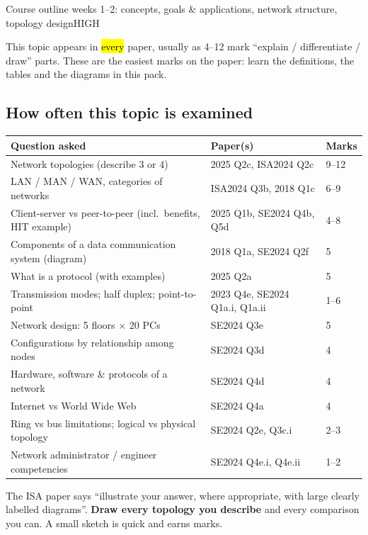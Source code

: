\documentclass[10pt]{article}
\begin{document}
  {Course outline weeks 1--2: concepts, goals \& applications, network structure, topology design}{HIGH}

This topic appears in \hl{every} paper, usually as 4--12 mark ``explain / differentiate / draw'' parts.
These are the easiest marks on the paper: learn the definitions, the tables and the diagrams in this pack.

\subsection*{How often this topic is examined}
\begin{tabularx}{\linewidth}{@{}Xll@{}}
\toprule
\textbf{Question asked} & \textbf{Paper(s)} & \textbf{Marks}\\
\midrule
Network topologies (describe 3 or 4) & 2025 Q2c, ISA2024 Q2c & 9--12\\
LAN / MAN / WAN, categories of networks & ISA2024 Q3b, 2018 Q1c & 6--9\\
Client-server vs peer-to-peer (incl.\ benefits, HIT example) & 2025 Q1b, SE2024 Q4b, Q5d & 4--8\\
Components of a data communication system (diagram) & 2018 Q1a, SE2024 Q2f & 5\\
What is a protocol (with examples) & 2025 Q2a & 5\\
Transmission modes; half duplex; point-to-point & 2023 Q4e, SE2024 Q1a.i, Q1a.ii & 1--6\\
Network design: 5 floors $\times$ 20 PCs & SE2024 Q3e & 5\\
Configurations by relationship among nodes & SE2024 Q3d & 4\\
Hardware, software \& protocols of a network & SE2024 Q4d & 4\\
Internet vs World Wide Web & SE2024 Q4a & 4\\
Ring vs bus limitations; logical vs physical topology & SE2024 Q2e, Q3c.i & 2--3\\
Network administrator / engineer competencies & SE2024 Q4e.i, Q4e.ii & 1--2\\
\bottomrule
\end{tabularx}

\begin{examtip}
The ISA paper says ``illustrate your answer, where appropriate, with large clearly labelled diagrams''.
\textbf{Draw every topology you describe} and every comparison you can. A small sketch is quick and earns marks.
\end{examtip}
\end{document}
